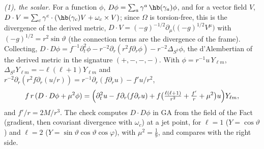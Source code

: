 \emph{(1), the scalar.} For a function $\phi$, $D\phi = \sum_{a}\gamma^{a}\,\hb(\gamma_{a})\phi$, and for a vector field $V$, $D \cdot V = \sum_{c}\gamma^{c} \cdot (\hb(\gamma_{c})V + \omega_{c} \times V)$; since $\Omega$ is torsion-free, this is the divergence of the derived metric, $D \cdot V = (-g)^{-1/2}\partial_{\mu}\bigl((-g)^{1/2}V^{\mu}\bigr)$ with $(-g)^{1/2} = r^{2}\sin\vartheta$ (the connection terms are the divergence of the frame). Collecting, $D \cdot D\phi = f^{-1}\partial_{t}^{2}\phi - r^{-2}\partial_{r}(r^{2}f\partial_{r}\phi) - r^{-2}\Delta_{S^{2}}\phi$, the d'Alembertian of the derived metric in the signature $(+,-,-,-)$. With $\phi = r^{-1}u\,Y_{\ell m}$, $\Delta_{S^{2}}Y_{\ell m} = -\ell(\ell+1)Y_{\ell m}$ and $r^{-2}\partial_{r}(r^{2}f\partial_{r}(u/r)) = r^{-1}\partial_{r}(f\partial_{r}u) - f'u/r^{2}$,
\[
f\,r\,(D \cdot D\phi + \mu^{2}\phi) = \Bigl(\partial_{t}^{2}u - f\partial_{r}(f\partial_{r}u) + f\bigl(\tfrac{\ell(\ell+1)}{r^{2}} + \tfrac{f'}{r} + \mu^{2}\bigr)u\Bigr)Y_{\ell m},
\]
and $f'/r = 2M/r^{3}$. The check computes $D \cdot D\phi$ in GA from the field of the Fact (gradient, then covariant divergence with $\omega_{c}$) at a jet point, for $\ell = 1$ ($Y = \cos\vartheta$) and $\ell = 2$ ($Y = \sin\vartheta\cos\vartheta\cos\varphi$), with $\mu^{2} = \tfrac19$, and compares with the right side.

